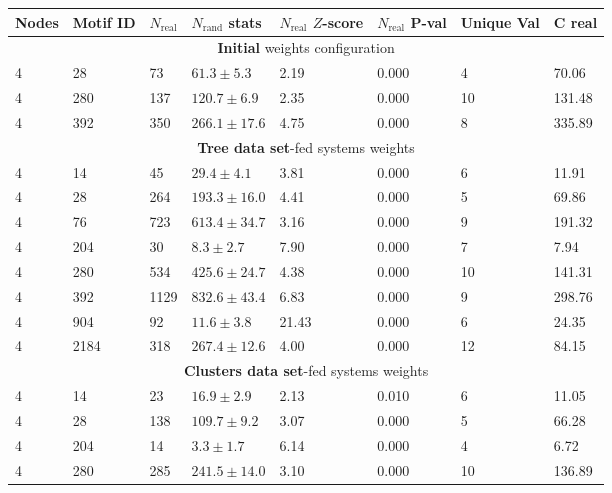 \documentclass[a4paper,12pt]{article}
\begin{document}
\begin{table}[h!]
	\begin{center}
		\begin{tabular}{||p{1cm} | p{1cm} | p{1cm} | p{2.5cm} | p{1.5cm} | p{1.5cm} | p{1cm} | p{1.5cm}||}			
			\hline
			Nodes & Motif ID & $N_{\text{real}}$ & $N_{\text{rand}}$ stats & $N_{\text{real}}$ $Z$-score &  $N_{\text{real}}$ P-val & Unique Val & C real \\
			\hline \hline
			\multicolumn{8}{c}{\textbf{Initial} weights configuration} \\
			\hline
			4 &28   & 73   & $ 61.3\pm5.3     $ & 2.19 & 0.000 & 4  & 70.06   \\
			4 &280  &  137 & $   120.7\pm6.9  $ & 2.35 & 0.000 & 10 &  131.48 \\
			4 &392  &  350 & $   266.1\pm17.6 $ & 4.75 & 0.000 & 8  & 335.89  \\
			\hline \hline
			\multicolumn{8}{c}{\textbf{Tree data set}-fed systems weights} \\
			\hline
			4 & 14   & 45    & $ 29.4\pm4.1      $ & 3.81  & 0.000  & 6   & 11.91   \\
			4 & 28   & 264   & $  193.3\pm16.0   $ & 4.41  & 0.000  & 5   & 69.86   \\
			4 & 76   & 723   & $  613.4\pm34.7   $ & 3.16  & 0.000  & 9   & 191.32  \\
			4 & 204  &  30   & $  8.3\pm2.7      $ & 7.90  & 0.000  & 7   & 7.94    \\
			4 & 280  &  534  & $   425.6\pm24.7  $ & 4.38  & 0.000  & 10  &  141.31 \\
			4 & 392  &  1129 & $    832.6\pm43.4 $ & 6.83  & 0.000  & 9   & 298.76  \\
			4 & 904  &  92   & $  11.6\pm3.8     $ & 21.43 &  0.000 &  6  &  24.35  \\
			4 & 2184 &   318 & $    267.4\pm12.6 $ & 4.00  & 0.000  & 12  &  84.15  \\
			\hline \hline
			\multicolumn{8}{c}{\textbf{Clusters data set}-fed systems weights} \\
			\hline
			4 & 14   & 23    & $ 16.9\pm2.9     $ & 2.13  & 0.010  & 6   &11.05    \\
			4 & 28   & 138   & $  109.7\pm9.2   $ & 3.07  & 0.000  & 5   &66.28    \\
			4 & 204  &  14   & $  3.3\pm1.7     $ & 6.14 &  0.000 &  4  & 6.72    \\
			4 & 280  &  285  & $   241.5\pm14.0 $ & 3.10 &  0.000 &  10 &  136.89 \\

\end{tabular}
\end{center}
\end{table}
\end{document}
